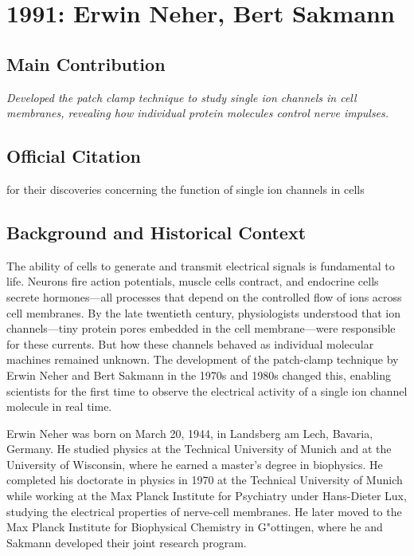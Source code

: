 \chapter[1991 --- Neher et al.]{1991: Erwin Neher, Bert Sakmann}
\label{ch:1991_Neher}

\section*{Main Contribution}

\textit{Developed the patch clamp technique to study single ion channels in cell membranes, revealing how individual protein molecules control nerve impulses.}\cite{nobel-1991,lecture-1991}

\section{Official Citation}

for their discoveries concerning the function of single ion channels in cells

\section{Background and Historical Context}

The ability of cells to generate and transmit electrical signals is fundamental to life. Neurons fire action potentials, muscle cells contract, and endocrine cells secrete hormones---all processes that depend on the controlled flow of ions across cell membranes. By the late twentieth century, physiologists understood that ion channels---tiny protein pores embedded in the cell membrane---were responsible for these currents. But how these channels behaved as individual molecular machines remained unknown. The development of the patch-clamp technique by Erwin Neher and Bert Sakmann in the 1970s and 1980s changed this, enabling scientists for the first time to observe the electrical activity of a single ion channel molecule in real time.

Erwin Neher was born on March 20, 1944, in Landsberg am Lech, Bavaria, Germany. He studied physics at the Technical University of Munich and at the University of Wisconsin, where he earned a master's degree in biophysics. He completed his doctorate in physics in 1970 at the Technical University of Munich while working at the Max Planck Institute for Psychiatry under Hans-Dieter Lux, studying the electrical properties of nerve-cell membranes. He later moved to the Max Planck Institute for Biophysical Chemistry in G{"o}ttingen, where he and Sakmann developed their joint research program.

